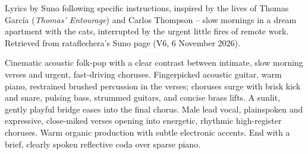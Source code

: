 
\label{sec:put-out-the-little-fires}
\begin{notes}
Lyrics by Suno following specific instructions, inspired by the lives of Thomas García (\emph{Thomas' Entourage}) and Carlos Thompson -- slow mornings in a dream apartment with the cats, interrupted by the urgent little fires of remote work. Retrieved from rataflechera's Suno page (V6, 6 November 2026).
\end{notes}
\begin{style}
Cinematic acoustic folk-pop with a clear contrast between intimate, slow morning verses and urgent, fast-driving choruses. Fingerpicked acoustic guitar, warm piano, restrained brushed percussion in the verses; choruses surge with brisk kick and snare, pulsing bass, strummed guitars, and concise brass lifts. A sunlit, gently playful bridge eases into the final chorus. Male lead vocal, plainspoken and expressive, close-miked verses opening into energetic, rhythmic high-register choruses. Warm organic production with subtle electronic accents. End with a brief, clearly spoken reflective coda over sparse piano.
\end{style}
